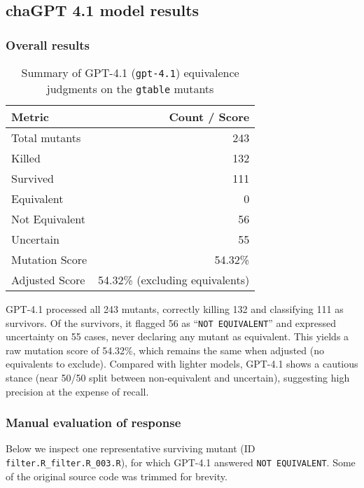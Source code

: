 \subsection{chaGPT 4.1 model results}

\subsubsection{Overall results}

\begin{table}[ht]
  \centering
  \begin{tabular}{lr}
    \hline\hline
    \textbf{Metric} & \textbf{Count / Score} \\
    \hline
    Total mutants & 243 \\
    Killed & 132 \\
    Survived & 111 \\
    Equivalent & 0 \\
    Not Equivalent & 56 \\
    Uncertain & 55 \\
    Mutation Score & 54.32\% \\
    Adjusted Score & 54.32\% (excluding equivalents) \\
    \hline
  \end{tabular}
  \caption{Summary of GPT-4.1 (\texttt{gpt-4.1}) equivalence judgments on the \texttt{gtable} mutants}
  \label{tab:gpt41-overall}
\end{table}

GPT-4.1 processed all 243 mutants, correctly killing 132 and classifying 111 as survivors.  Of the survivors, it flagged 56 as “\texttt{NOT EQUIVALENT}” and expressed uncertainty on 55 cases, never declaring any mutant as equivalent.  This yields a raw mutation score of 54.32\%, which remains the same when adjusted (no equivalents to exclude).  Compared with lighter models, GPT-4.1 shows a cautious stance (near 50/50 split between non-equivalent and uncertain), suggesting high precision at the expense of recall.

\subsubsection{Manual evaluation of response}

Below we inspect one representative surviving mutant (ID \texttt{filter.R\_filter.R\_003.R}), for which GPT-4.1 answered \texttt{NOT EQUIVALENT}.  Some of the original source code was trimmed for brevity.

